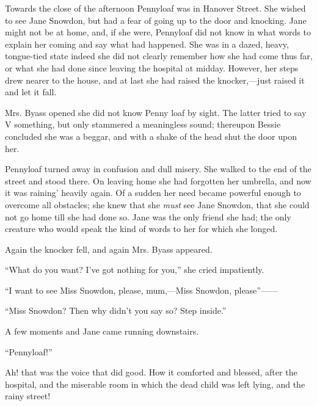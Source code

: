 Towards the close of the afternoon Pennyloaf was in Hanover Street. She
wished to see Jane Snowdon, but had a fear of going up to the door and
knocking. Jane might not be at home, and, if she were, Pennyloaf did not
know in what words to explain her coming and say what had happened. She
was in a dazed, heavy, tongue-tied state indeed she did not clearly
remember how she had come thus far, or what she had done since leaving
the hospital at midday. However, her steps drew nearer to the house, and
at last she had raised the knocker,---just raised it and let it fall.

Mrs. Byass opened she did not know Penny loaf by sight. The latter tried
to say V something, but only stammered a meaningless sound; thereupon
Bessie concluded she was a beggar, and with a shake of the head shut the
door upon her.

Pennyloaf turned away in confusion and dull
{\protect\hypertarget{46}{}{}}misery. She walked to the end of the
street and stood there. On leaving home she had forgotten her umbrella,
and now it was raining' heavily again. Of a sudden her need became
powerful enough to overcome all obstacles; she knew that she \emph{must}
see Jane Snowdon, that she could not go home till she had done so. Jane
was the only friend she had; the only creature who would speak the kind
of words to her for which she longed.

Again the knocker fell, and again Mrs. Byass appeared.

``What do you want? I've got nothing for you,'' she cried impatiently.

``I want to see Miss Snowdon, please, mum,---Miss Snowdon,
please''{{------}}

``Miss Snowdon? Then why didn't you say so? Step inside.''

A few moments and Jane came running downstairs.

``Pennyloaf!''

Ah! that was the voice that did good. How it comforted and blessed,
after the hospital, and the miserable room in which the dead child was
left lying, and the rainy street!
